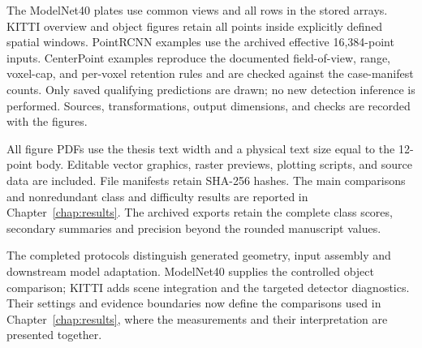 The ModelNet40 plates use common views and all rows in the stored arrays.
KITTI overview and object figures retain all points inside explicitly
defined spatial windows. PointRCNN examples use the archived effective
16,384-point inputs. CenterPoint examples reproduce the documented
field-of-view, range, voxel-cap, and per-voxel retention rules and are
checked against the case-manifest counts. Only saved qualifying
predictions are drawn; no new detection inference is performed.
Sources, transformations, output dimensions, and checks are recorded
with the figures.

All figure PDFs use the thesis text width and a physical text size
equal to the 12-point body. Editable vector graphics, raster previews, plotting scripts,
and source data are included. File manifests retain SHA-256 hashes.
The main comparisons and nonredundant class and difficulty results are
reported in Chapter~\ref{chap:results}. The archived exports retain the
complete class scores, secondary summaries and precision beyond the
rounded manuscript values.

The completed protocols distinguish generated geometry, input
assembly and downstream model adaptation. ModelNet40 supplies the
controlled object comparison; KITTI adds scene integration and the
targeted detector diagnostics. Their settings and evidence boundaries
now define the comparisons used in Chapter~\ref{chap:results}, where
the measurements and their interpretation are presented together.
